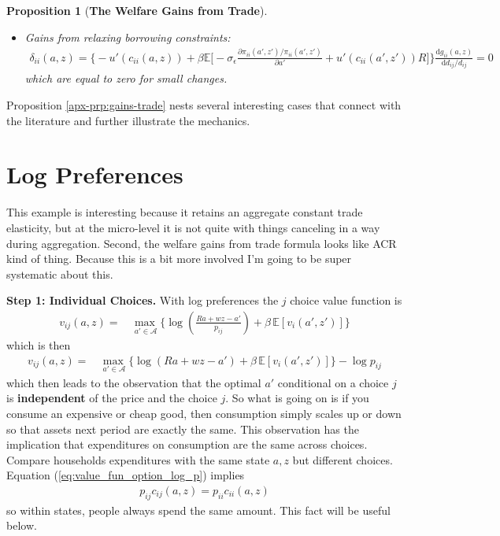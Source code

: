 \documentclass[12pt,pdftex]{article}
\newtheorem{prp}{Proposition}
\begin{document}
\begin{onehalfspacing}
\begin{prp}[\textbf{The Welfare Gains from Trade}]
\begin{itemize}
\item Gains from relaxing borrowing constraints:
\begin{align}
\nonumber
\delta_{ii}(a,z) = \bigg \{- u'(c_{ii}(a,z)) + \beta \mathbb{E} \big [-\sigma_{\epsilon} \frac{\partial \pi_{ii}(a',z') / \pi_{ii}(a',z')}{\partial a'} + u'(c_{ii}(a',z'))R \big ] \bigg \}\frac{\mathrm{d} g_{ii}(a,z)}{\mathrm{d} d_{ij} / d_{ij}} = 0
\end{align}
which are equal to zero for small changes.
\end{itemize}
\end{prp}
Proposition \ref{apx-prp:gains-trade} nests several interesting cases that connect with the literature and further illustrate the mechanics.

\section{Log Preferences}\label{apx-sec:log-preferences}

This example is interesting because it retains an aggregate constant trade elasticity, but at the micro-level it is not quite with things canceling in a way during aggregation. Second, the welfare gains from trade formula looks like ACR kind of thing. Because this is a bit more involved I'm going to be super systematic about this.

\textbf{Step 1: Individual Choices.} With log preferences the $j$ choice value function is
\begin{align}
v_{ij}(a, z) = &  \max_{\ a' \in \mathcal{A} }\bigg  \{ \log\left (\frac{Ra + wz - a'}{p_{ij}} \right )  + \beta \, \mathbb{E} [v_{i}(a', z')]  \bigg\}
\end{align}
which is then
\begin{align}
v_{ij}(a, z) = &  \max_{\ a' \in \mathcal{A} }\bigg  \{ \log(Ra + wz - a' )  + \beta \, \mathbb{E} [v_{i}(a', z' )]  \bigg\} - \log p_{ij}
\label{eq:value_fun_option_log_p}
\end{align}
which then leads to the observation that the optimal $a'$ conditional on a choice $j$ is \textbf{independent} of the price and the choice $j$. So what is going on is if you consume an expensive or cheap good, then consumption simply scales up or down so that assets next period are exactly the same. This observation has the implication that expenditures on consumption are the same across choices. Compare households expenditures with the same state $a,z$ but different choices. Equation (\ref{eq:value_fun_option_log_p}) implies
\begin{align}
p_{ij}c_{ij}(a,z) = p_{ii}c_{ii}(a,z)
\label{eq:apx-same-spending}
\end{align}
so within states, people always spend the same amount. This fact will be useful below.


\end{onehalfspacing}
\end{document}
